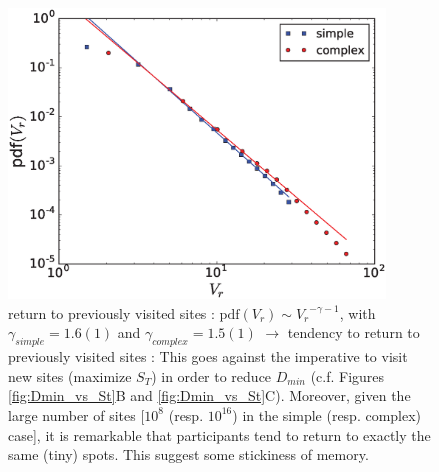 \begin{figure}[h!]
\begin{center}
\includegraphics[width=10cm]{figures/pdf_return.eps}
\caption{return to previously visited sites : $\mathrm{pdf}(V_r) \sim {V_r}^{- \gamma -1}$, with $\gamma_{simple} = 1.6(1)$ and $\gamma_{complex} = 1.5(1)$ $\rightarrow$ tendency to return to previously visited sites : This goes against the imperative to visit new sites (maximize $S_T$) in order to reduce $D_{min}$ (c.f. Figures \ref{fig:Dmin_vs_St}B and \ref{fig:Dmin_vs_St}C). Moreover, given the large number of sites [$10^{8}$ (resp. $10^{16}$) in the simple (resp. complex) case], it is remarkable that participants tend to return to exactly the same (tiny) spots. This suggest some stickiness of memory.}
\label{fig:pdf_return}
\end{center}
\end{figure}



